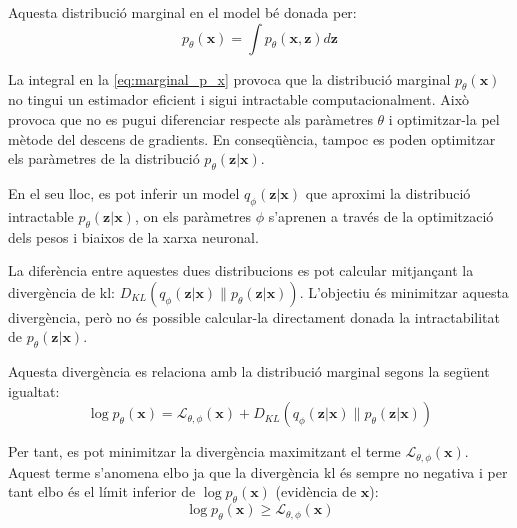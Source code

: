 \documentclass[CAT,BIB]{TFUOC}%
\begin{document}
        Aquesta distribució marginal en el model bé donada per:
        \begin{equation}
        \label{eq:marginal_p_x}
            p_\theta(\mathbf{x}) = \int p_\theta(\mathbf{x, z}) d\mathbf{z}
        \end{equation}

        La integral en la \cref{eq:marginal_p_x} provoca que
        la distribució marginal $p_\theta(\mathbf{x})$ no tingui un estimador eficient
        i sigui intractable computacionalment.
        Això provoca que no es pugui diferenciar respecte als paràmetres $\theta$
        i optimitzar-la pel mètode del descens de gradients.
        En conseqüència,
        tampoc es poden optimitzar els paràmetres de la distribució $p_\theta(\mathbf{z|x})$.

        En el seu lloc,
        es pot inferir un model $q_\phi(\mathbf{z|x})$
        que aproximi la distribució intractable $p_\theta(\mathbf{z|x})$,
        on els paràmetres $\phi$ s'aprenen a través de la optimització
        dels pesos i biaixos de la xarxa neuronal.

        La diferència entre aquestes dues distribucions
        es pot calcular mitjançant la divergència de \gls{kl}:
        $D_{KL} ( q_\phi(\mathbf{z|x}) \| p_\theta(\mathbf{z|x}) )$.
        L'objectiu és minimitzar aquesta divergència,
        però no és possible calcular-la directament
        donada la intractabilitat de $p_\theta(\mathbf{z|x})$.

        Aquesta divergència es relaciona amb la distribució marginal
        segons la següent igualtat:
        \begin{equation}
            \label{eq:kl}
            \log p_\theta(\mathbf{x}) =
            \mathcal{L}_{\theta,\phi}(\mathbf{x}) +
            D_{KL} (
            q_\phi(\mathbf{z|x}) \|
            p_\theta(\mathbf{z|x})
            )
        \end{equation}

        Per tant, es pot minimitzar la divergència maximitzant el terme $\mathcal{L}_{\theta,\phi}(\mathbf{x})$.
        Aquest terme s'anomena \gls{elbo}
        ja que la divergència \gls{kl} és sempre no negativa i
        per tant \gls{elbo} és el límit inferior de $\log p_\theta(\mathbf{x})$
        (evidència de $\mathbf{x}$):
        \begin{equation}
            \label{eq:lim_inf}
            \log p_\theta(\mathbf{x}) \ge
            \mathcal{L}_{\theta,\phi}(\mathbf{x})
        \end{equation}
\end{document}
